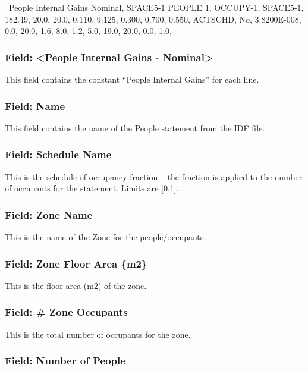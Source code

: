 ~People Internal Gains Nominal,  SPACE5-1 PEOPLE 1, OCCUPY-1, SPACE5-1, 182.49, 20.0, 20.0, 0.110, 9.125, 0.300, 0.700, 0.550, ACTSCHD, No, 3.8200E-008, 0.0, 20.0, 1.6, 8.0, 1.2, 5.0, 19.0, 20.0, 0.0, 1.0,

\subsubsection{Field: \textless{}People Internal Gains - Nominal\textgreater{}}\label{field-people-internal-gains---nominal}

This field contains the constant ``People Internal Gains'' for each line.

\subsubsection{Field: Name}\label{field-name-1}

This field contains the name of the People statement from the IDF file.

\subsubsection{Field: Schedule Name}\label{field-schedule-name}

This is the schedule of occupancy fraction -- the fraction is applied to the number of occupants for the statement. Limits are {[}0,1{]}.

\subsubsection{Field: Zone Name}\label{field-zone-name-2}

This is the name of the Zone for the people/occupants.

\subsubsection{Field: Zone Floor Area \{m2\}}\label{field-zone-floor-area-m2}

This is the floor area (m2) of the zone.

\subsubsection{Field: \# Zone Occupants}\label{field-zone-occupants}

This is the total number of occupants for the zone.

\subsubsection{Field: Number of People}\label{field-number-of-people}

